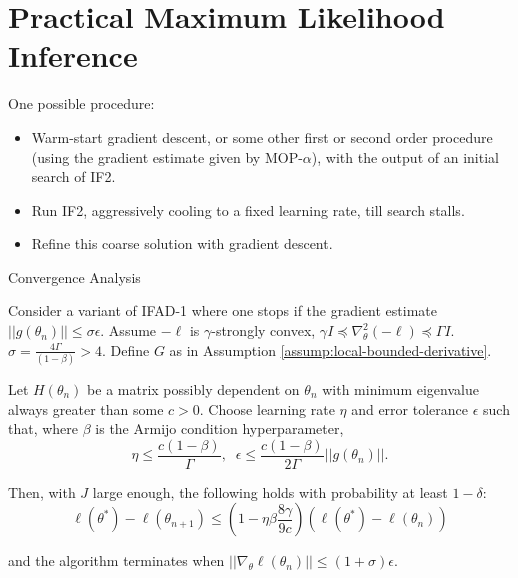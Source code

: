 \documentclass{beamer}
\begin{document}
\section{Practical Maximum Likelihood Inference}

\begin{frame}{One possible procedure:}
    \begin{itemize}
        \item Warm-start gradient descent, or some other first or second order procedure (using the gradient estimate given by MOP-$\alpha$), with the output of an initial search of IF2. 
        \item \pause Run IF2, aggressively cooling to a fixed learning rate, till search stalls.
        \item \pause Refine this coarse solution with gradient descent.
    \end{itemize}
    \pause
\end{frame}


\begin{frame}{Convergence Analysis}
    \begin{prop}
        \label{thm:convergence}
        
        Consider a variant of IFAD-1 where one stops if the gradient estimate $||g(\theta_n)|| \leq \sigma \epsilon$. Assume $-\ell$ is $\gamma$-strongly convex, $\gamma I \preceq \nabla_\theta^2 (-\ell) \preceq \Gamma I$. $\sigma = \frac{4 \Gamma}{(1-\beta)}> 4$. Define $G$ as in Assumption \ref{assump:local-bounded-derivative}.
        
        Let $H(\theta_n)$ be a matrix possibly dependent on $\theta_n$ with minimum eigenvalue always greater than some $c>0$. Choose learning rate $\eta$ and error tolerance $\epsilon$ such that, where $\beta$ is the Armijo condition hyperparameter,
        \begin{equation*}
            \eta \leq \frac{c(1-\beta)}{\Gamma}, \;\; \epsilon \leq \frac{c(1-\beta)}{2\Gamma}||g(\theta_n)||.
        \end{equation*}
        
        Then, with $J$ large enough, the following holds with probability at least $1-\delta$:
        \begin{equation*}
        \ell(\theta^*) - \ell(\theta_{n+1}) \leq \left(1-\eta\beta\frac{8\gamma}{9c}\right)(\ell(\theta^*)-\ell(\theta_n))
        \end{equation*}
        
        and the algorithm terminates when $||\nabla_\theta \ell(\theta_n)|| \leq (1+\sigma) \epsilon$.
        \end{prop}
\end{frame}
\end{document}
